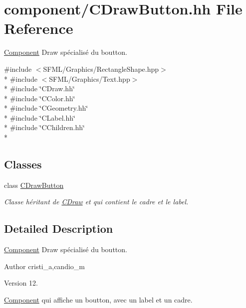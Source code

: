 \hypertarget{_c_draw_button_8hh}{}\section{component/\+C\+Draw\+Button.hh File Reference}
\label{_c_draw_button_8hh}


\hyperlink{class_component}{Component} Draw spécialisé du boutton.  


{\ttfamily \#include $<$S\+F\+M\+L/\+Graphics/\+Rectangle\+Shape.\+hpp$>$}\\*
{\ttfamily \#include $<$S\+F\+M\+L/\+Graphics/\+Text.\+hpp$>$}\\*
{\ttfamily \#include \char`\"{}C\+Draw.\+hh\char`\"{}}\\*
{\ttfamily \#include \char`\"{}C\+Color.\+hh\char`\"{}}\\*
{\ttfamily \#include \char`\"{}C\+Geometry.\+hh\char`\"{}}\\*
{\ttfamily \#include \char`\"{}C\+Label.\+hh\char`\"{}}\\*
{\ttfamily \#include \char`\"{}C\+Children.\+hh\char`\"{}}\\*
\subsection*{Classes}
\begin{DoxyCompactItemize}
\item 
class \hyperlink{class_c_draw_button}{C\+Draw\+Button}
\begin{DoxyCompactList}\small\item\em Classe héritant de \hyperlink{class_c_draw}{C\+Draw} et qui contient le cadre et le label. \end{DoxyCompactList}\end{DoxyCompactItemize}


\subsection{Detailed Description}
\hyperlink{class_component}{Component} Draw spécialisé du boutton. 

\begin{DoxyAuthor}{Author}
cristi\+\_\+a,candio\+\_\+m 
\end{DoxyAuthor}
\begin{DoxyVersion}{Version}
12.
\end{DoxyVersion}
\hyperlink{class_component}{Component} qui affiche un boutton, avec un label et un cadre. 